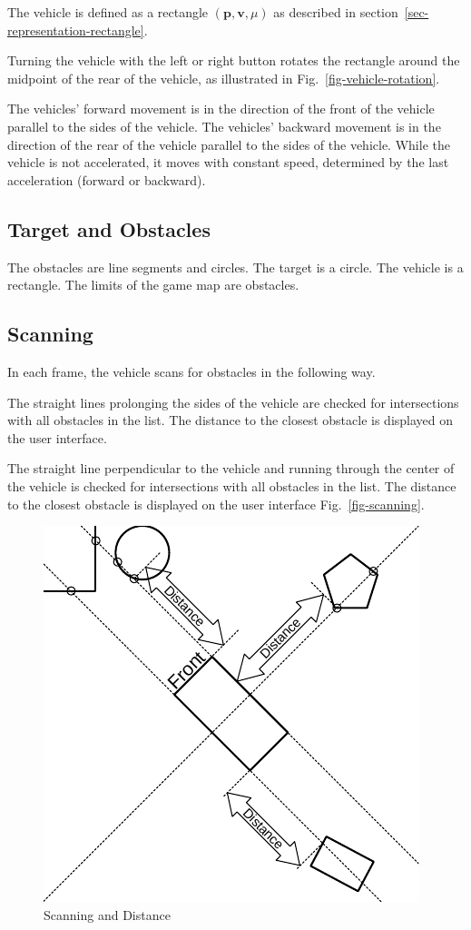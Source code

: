 \documentclass[11pt]{article}
\newcommand{\pb}{\mathbf{p}}
\newcommand{\vb}{\mathbf{v}}
\newcommand{\figref}[1]{Fig.~\eqref{#1}}
\begin{document}
The vehicle is defined as a rectangle $(\pb, \vb, \mu)$ as described in
section~\ref{sec-representation-rectangle}.

Turning the vehicle with the left or right button rotates the rectangle
around the midpoint of the rear of the vehicle, as
illustrated in \figref{fig-vehicle-rotation}.

The vehicles' forward movement is in the direction of the front of the vehicle
parallel to the sides of the vehicle.
The vehicles' backward movement is in the direction of the rear of the vehicle
parallel to the sides of the vehicle.
While the vehicle is not accelerated, it moves with constant speed, determined
by the last acceleration (forward or backward).

\subsection{Target and Obstacles}
\label{sec-obstacles}

The obstacles are line segments and circles. The target is a circle. The
vehicle is a rectangle. The limits of the game map are obstacles.

\subsection{Scanning}
\label{sec-game-scanning}
In each frame, the vehicle scans for obstacles in the following way.

The straight lines prolonging the sides of the vehicle are checked for
intersections with all obstacles in the list. The distance to the closest
obstacle is displayed on the user interface.

The straight line perpendicular to the vehicle and running through the center
of the vehicle is checked for intersections with all obstacles in the list.
The distance to the closest obstacle is displayed on the user interface
\figref{fig-scanning}.

\begin{figure}
    \centering
    \includegraphics{odg/scanning.pdf}
    \caption{Scanning and Distance}\label{fig-scanning}
\end{figure}
\end{document}
